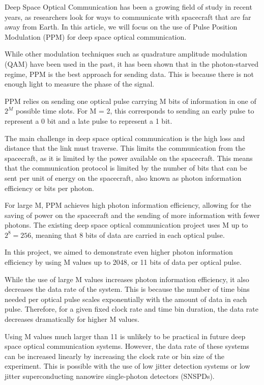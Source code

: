 \documentclass[11pt]{caltech_thesis} %
\begin{document}
Deep Space Optical Communication has been a growing field of study in
recent years, as researchers look for ways to communicate with
spacecraft that are far away from Earth. In this article, we will focus
on the use of Pulse Position Modulation (PPM) for deep space optical
communication.

While other modulation techniques such as quadrature amplitude
modulation (QAM) have been used in the past, it has been shown that in
the photon-starved regime, PPM is the best approach for sending data.
This is because there is not enough light to measure the phase of the
signal.

PPM relies on sending one optical pulse carrying M bits of information
in one of \(2^M\) possible time slots. For M = 2, this corresponds to
sending an early pulse to represent a 0 bit and a late pulse to
represent a 1 bit.

The main challenge in deep space optical communication is the high loss
and distance that the link must traverse. This limits the communication
from the spacecraft, as it is limited by the power available on the
spacecraft. This means that the communication protocol is limited by the
number of bits that can be sent per unit of energy on the spacecraft,
also known as photon information efficiency or bits per photon.

For large M, PPM achieves high photon information efficiency, allowing
for the saving of power on the spacecraft and the sending of more
information with fewer photons. The existing deep space optical
communication project uses M up to \(2^8 = 256\), meaning that 8 bits of
data are carried in each optical pulse.

In this project, we aimed to demonstrate even higher photon information
efficiency by using M values up to 2048, or 11 bits of data per optical
pulse.

While the use of large M values increases photon information efficiency,
it also decreases the data rate of the system. This is because the
number of time bins needed per optical pulse scales exponentially with
the amount of data in each pulse. Therefore, for a given fixed clock
rate and time bin duration, the data rate decreases dramatically for
higher M values.

Using M values much larger than 11 is unlikely to be practical in future
deep space optical communication systems. However, the data rate of
these systems can be increased linearly by increasing the clock rate or
bin size of the experiment. This is possible with the use of low jitter
detection systems or low jitter superconducting nanowire single-photon
detectors (SNSPDs).
\end{document}
